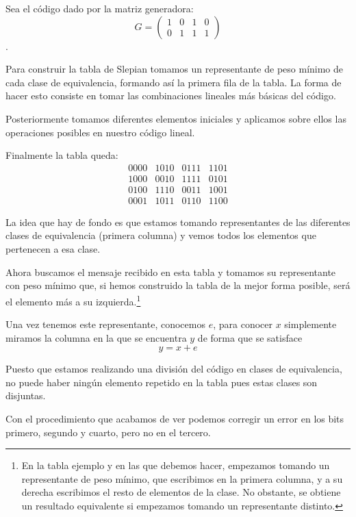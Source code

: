 \begin{example}
Sea el código dado por la matriz generadora:
\[G = \left( \begin{array}{cccc} 1 & 0 & 1 & 0 \\ 0 & 1 & 1 & 1 \end{array}\right)\].

Para construir la tabla de Slepian tomamos un representante de peso mínimo de cada clase de equivalencia, formando así la primera fila de la tabla. La forma de hacer esto consiste en tomar las combinaciones lineales más básicas del código.

Posteriormente tomamos diferentes elementos iniciales y aplicamos sobre ellos las operaciones posibles en nuestro código lineal.

Finalmente la tabla queda:
\[\begin{array}{cccc}
0000 & 1010 & 0111 & 1101 \\
1000 & 0010 & 1111 & 0101 \\
0100 & 1110 & 0011 & 1001 \\
0001 & 1011 & 0110 & 1100
\end{array}\]

La idea que hay de fondo es que estamos tomando representantes de las diferentes clases de equivalencia (primera columna) y vemos todos los elementos que pertenecen a esa clase.

Ahora buscamos el mensaje recibido en esta tabla y tomamos su representante con peso mínimo que, si hemos construido la tabla de la mejor forma posible, será el elemento más a su izquierda.\footnote{En la tabla ejemplo y en las que debemos hacer, empezamos tomando un representante de peso mínimo, que escribimos en la primera columna, y a su derecha escribimos el resto de elementos de la clase. No obstante, se obtiene un resultado equivalente si empezamos tomando un representante distinto.}

Una vez tenemos este representante, conocemos $e$, para conocer $x$ simplemente miramos la columna en la que se encuentra $y$ de forma que se satisface
\[y=x+e\]

\obs Puesto que estamos realizando una división del código en clases de equivalencia, no puede haber ningún elemento repetido en la tabla pues estas clases son disjuntas.
\end{example}

Con el procedimiento que acabamos de ver podemos corregir un error en los bits primero, segundo y cuarto, pero no en el tercero.


